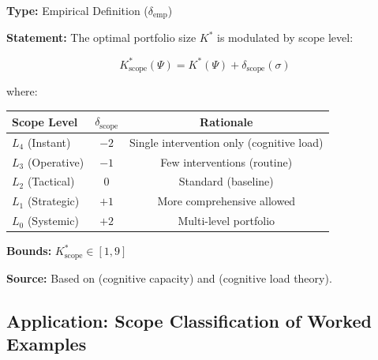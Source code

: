 \begin{tcolorbox}[colback=blue!5!white, colframe=blue!75!black,
    title=\textbf{Definition EIT-EMP-3-D3: Scope Adjustment for K*}]

\textbf{Type:} Empirical Definition ($\delta_{\text{emp}}$)

\textbf{Statement:} The optimal portfolio size $K^*$ is modulated by scope level:

\begin{equation}
K^*_{\text{scope}}(\Psi) = K^*(\Psi) + \delta_{\text{scope}}(\sigma)
\end{equation}

where:
\begin{center}
\begin{tabular}{lcc}
\toprule
\textbf{Scope Level} & $\delta_{\text{scope}}$ & \textbf{Rationale} \\
\midrule
$L_4$ (Instant) & $-2$ & Single intervention only (cognitive load) \\
$L_3$ (Operative) & $-1$ & Few interventions (routine) \\
$L_2$ (Tactical) & $0$ & Standard (baseline) \\
$L_1$ (Strategic) & $+1$ & More comprehensive allowed \\
$L_0$ (Systemic) & $+2$ & Multi-level portfolio \\
\bottomrule
\end{tabular}
\end{center}

\textbf{Bounds:} $K^*_{\text{scope}} \in [1, 9]$

\textbf{Source:} Based on \citet{miller1956magical} (cognitive capacity) and \citet{sweller1988cognitive} (cognitive load theory).

\end{tcolorbox}

\subsection{Application: Scope Classification of Worked Examples}
\label{subsec:scope-examples}

